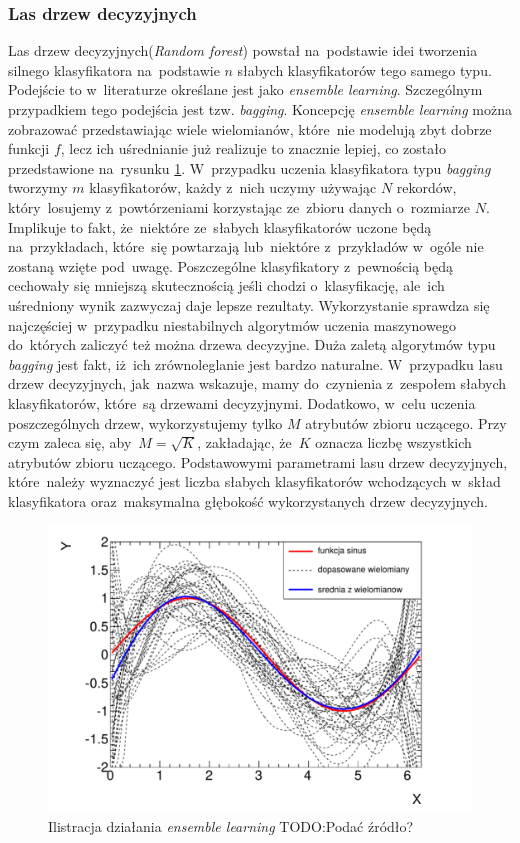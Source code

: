 \subsubsection{Las drzew decyzyjnych}
Las drzew decyzyjnych(\textit{Random forest}) powstał na~podstawie idei tworzenia silnego klasyfikatora na~podstawie $n$ słabych klasyfikatorów tego samego typu. Podejście to w~literaturze określane jest jako \textit{ensemble learning}. Szczególnym przypadkiem tego podejścia jest tzw. \textit{bagging}\cite{gonczarek}. Koncepcję \textit{ensemble learning} można zobrazować przedstawiając wiele wielomianów, które~nie modelują zbyt dobrze funkcji $f$, lecz ich uśrednianie już realizuje to znacznie lepiej, co zostało przedstawione na~rysunku \ref{avg1}.  W~przypadku uczenia klasyfikatora typu \textit{bagging} tworzymy $m$ klasyfikatorów, każdy z~nich uczymy używając $N$ rekordów, który~losujemy z~powtórzeniami korzystając ze~zbioru danych o~rozmiarze $N$. Implikuje to fakt, że~niektóre ze~słabych klasyfikatorów uczone będą na~przykładach, które~się powtarzają lub~niektóre z~przykładów w~ogóle nie zostaną wzięte pod~uwagę. Poszczególne klasyfikatory z~pewnością będą cechowały się mniejszą skutecznością jeśli chodzi o~klasyfikację, ale~ich uśredniony wynik zazwyczaj daje lepsze rezultaty. Wykorzystanie sprawdza się najczęściej w~przypadku niestabilnych algorytmów uczenia maszynowego do~których zaliczyć też można drzewa decyzyjne\cite{ensemble}. Duża zaletą algorytmów typu \textit{bagging} jest fakt, iż~ich zrównoleglanie jest bardzo naturalne.
W~przypadku lasu drzew decyzyjnych, jak~nazwa wskazuje, mamy do~czynienia z~zespołem słabych klasyfikatorów, które~są drzewami decyzyjnymi. Dodatkowo, w~celu uczenia poszczególnych drzew, wykorzystujemy tylko $M$ atrybutów zbioru uczącego. Przy czym zaleca się, aby~$M=\sqrt{K}$, zakładając, że~$K$ oznacza liczbę wszystkich atrybutów zbioru uczącego. Podstawowymi parametrami lasu drzew decyzyjnych, które~należy wyznaczyć jest liczba słabych klasyfikatorów wchodzących w~skład klasyfikatora oraz~maksymalna głębokość wykorzystanych drzew decyzyjnych.
\begin{figure}[ht!]
\centering
\includegraphics[scale=0.7]{res/avg1.png}
\caption[Caption for LOF]{Ilistracja działania \textit{ensemble learning} TODO:Podać źródło?\label{avg1}}
\end{figure} 

